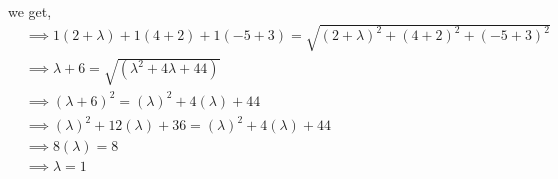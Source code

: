 \documentclass[11pt, a4paper]{article}
\providecommand{\brak}[1]{\ensuremath{\left(#1\right)}}
\begin{document}
\begin{enumerate}
\begin{align*}
\end{align*}
we get,
\begin{align}   
&\implies 1\brak{2+\lambda}+1\brak{4+2}+1\brak{-5+3}=\sqrt{\brak{2+\lambda}^2+\brak{4+2}^2+\brak{-5+3}^2}\\
& \implies \lambda +6 = \sqrt{\brak{\lambda ^2+4 \lambda +44}}\\
& \implies\brak{ \lambda +6}^2 = \brak{\lambda} ^2+4 \brak{\lambda} +44\\
& \implies \brak{\lambda}^2+12\brak{ \lambda }+36 = \brak{ \lambda }^2+4 \brak{\lambda} +44\\
& \implies  8\brak{\lambda} = 8\\
 &\implies \lambda = 1
\end{align}
\end{enumerate}
\end{document}
